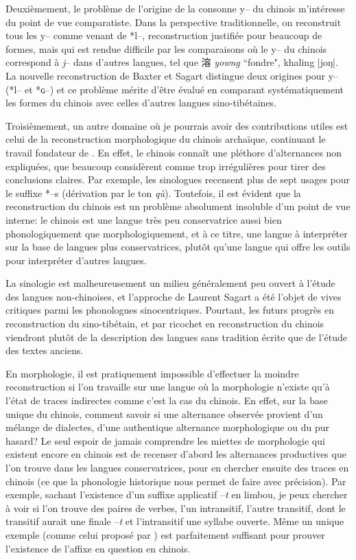 \documentclass[oldfontcommands,oneside,a4paper,11pt]{memoir}
\newcommand{\ipa}[1]{{\phon #1}} %
\newcommand{\zh}[1]{{\cn #1}}
\begin{document}
Deuxièmement, le problème de l'origine de la consonne \ipa{y--} du chinois m'intéresse du point de vue comparatiste. Dans la perspective traditionnelle, on reconstruit tous les y-- comme venant de *l--, reconstruction justifiée pour beaucoup de formes, mais qui est rendue difficile par les comparaisons où le \ipa{y--} du chinois correspond  à \textit{j}-- dans d'autres langues, tel que \zh{溶} \textit{yowng} ``fondre", khaling |joŋ|.  La nouvelle reconstruction de Baxter et Sagart distingue deux origines pour \ipa{y--} (*l-- et *ɢ--) et ce problème mérite d'être évalué en comparant systématiquement les formes du chinois avec celles d'autres langues sino-tibétaines.


Troisièmement, un autre domaine où je pourrais avoir des contributions utiles est celui de la reconstruction morphologique du chinois archaïque, continuant le travail fondateur de \citet{sagart99roc}. En effet, le chinois connaît une pléthore d'alternances non expliquées, que beaucoup   considèrent   comme trop irrégulières pour tirer des conclusions claires. Par exemple, les sinologues recensent plus de sept usages pour le suffixe *--s (dérivation par le ton \textit{qù}). Toutefois, il est évident que la reconstruction du chinois est un problème absolument insoluble d'un point de vue interne: le chinois est une langue très peu conservatrice aussi bien phonologiquement que morphologiquement, et à ce titre, une langue à interpréter sur la base de langues plus conservatrices, plutôt qu'une langue qui offre les outils pour interpréter d'autres langues. 

La sinologie est malheureusement un milieu généralement peu ouvert à l'étude des langues non-chinoises, et l'approche de Laurent Sagart a été l'objet de vives critiques parmi les phonologues sinocentriques.   Pourtant, les futurs  progrès en reconstruction du sino-tibétain, et par ricochet en reconstruction du chinois viendront plutôt de la description des langues sans tradition écrite que de l'étude des textes anciens. 
 


En morphologie, il est pratiquement impossible d'effectuer la moindre reconstruction si l'on travaille sur une langue où la morphologie n'existe qu'à l'état de traces indirectes comme c'est la cas du chinois. En effet, sur la base unique du chinois, comment savoir si une alternance observée provient d'un mélange de dialectes, d'une authentique alternance morphologique ou du pur hasard? Le seul espoir de jamais comprendre les miettes de morphologie qui existent encore en chinois est de recenser d'abord les alternances productives que l'on trouve dans les langues  conservatrices, pour  en chercher ensuite des traces en chinois (ce que la phonologie historique nous permet de faire avec précision). Par exemple, sachant l'existence d'un suffixe applicatif --\textit{t} en limbou, je peux chercher à voir si l'on trouve des paires de verbes, l'un intransitif, l'autre transitif, dont le transitif aurait une finale --\textit{t} et l'intransitif une syllabe ouverte. Même un unique exemple (comme celui proposé par \citet{sagart04directions}) est parfaitement suffisant pour prouver l'existence de l'affixe en question en chinois. 
\end{document}
